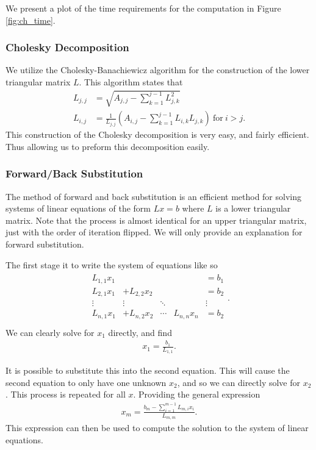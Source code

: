 \documentclass[../fem.tex]{subfiles}
\begin{document}
We present a plot of the time requirements for the computation in
Figure \ref{fig:ch_time}.

\subsubsection{Cholesky Decomposition}%
\label{ssub:cholesky_decomposition}


We utilize the Cholesky-Banachiewicz algorithm for the construction of the
lower triangular matrix $L$. This algorithm states that
\begin{align*}
  L_{j,j}&=\sqrt{A_{j,j}-\sum_{k=1}^{j-1}L_{j,k}^2}\\
  L_{i,j}&=\frac{1}{L_{j,j}}\left(A_{i,j}-\sum_{k=1}^{j-1}L_{i,k}L_{j,k}\right)\
  \text{for}\ i>j.
\end{align*}
This construction of the Cholesky decomposition is very easy, and fairly
efficient. Thus allowing us to preform this decomposition easily.

\subsubsection{Forward/Back Substitution}%
\label{ssub:forward_back_substitution}

The method of forward and back substitution is an efficient method for solving
systems of linear equations of the form $Lx=b$ where $L$ is a lower triangular
matrix. Note that the process is almost identical for an upper triangular
matrix, just with the order of iteration flipped. We will only provide an
explanation for forward substitution.

The first stage it to write the system of equations like so
\begin{align*}
  \begin{matrix}
    L_{1,1}x_1 & & & & =b_1\\
    L_{2,1}x_1 & +L_{2,2}x_2 & & & =b_2\\
    \vdots & \vdots & \ddots & & \vdots\\
    L_{n,1}x_1 & +L_{n,2}x_2 & \cdots & L_{n,n}x_n & =b_2\\
  \end{matrix}.
\end{align*}
We can clearly solve for $x_1$ directly, and find
\begin{align*}
  x_1=\frac{b_1}{L_{1,1}}.
\end{align*}

It is possible to substitute this into the second equation. This will cause the
second equation to only have one unknown $x_2$, and so we can directly solve
for $x_2$. This process is repeated for all $x$. Providing the general
expression
\begin{align*}
  x_m=\frac{b_m-\sum_{i=1}^{m-1}L_{m,i}x_i}{L_{m,m}}.
\end{align*}
This expression can then be used to compute the solution to the system of
linear equations.
\end{document}
